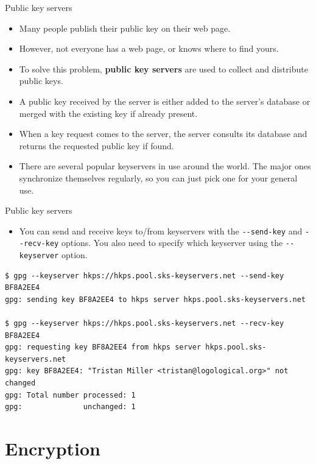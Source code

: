 \documentclass[
mode=present,
paper=smartboard,
size=20pt,
]{powerdot}
\newcommand{\clopt}[1]{\texttt{{-}#1}}
\begin{document}
\begin{slide}{Public key servers}
  \begin{itemize}
  \item Many people publish their public key on their web page.
  \item However, not everyone has a web page, or knows where to find
    yours.
  \item To solve this problem, \textbf{public key servers} are used to
    collect and distribute public keys.
  \item A public key received by the server is either added to the
    server's database or merged with the existing key if already
    present.
  \item When a key request comes to the server, the server consults
    its database and returns the requested public key if found.
  \item There are several popular keyservers in use around the world.
    The major ones synchronize themselves regularly, so you can just
    pick one for your general use.
  \end{itemize}
\end{slide}

\makeatletter\renewcommand{\verbatim@font}{\footnotesize\tt}\makeatother
\begin{slide}[method=direct,toc=]{Public key servers}
  \begin{itemize}
  \item You can send and receive keys to/from keyservers with the
    \clopt{-send-key} and \clopt{-recv-key} options.  You also need to
    specify which keyserver using the \clopt{-keyserver} option.
  \end{itemize}
\begin{verbatim}
$ gpg --keyserver hkps://hkps.pool.sks-keyservers.net --send-key BF8A2EE4
gpg: sending key BF8A2EE4 to hkps server hkps.pool.sks-keyservers.net

$ gpg --keyserver hkps://hkps.pool.sks-keyservers.net --recv-key BF8A2EE4
gpg: requesting key BF8A2EE4 from hkps server hkps.pool.sks-keyservers.net
gpg: key BF8A2EE4: "Tristan Miller <tristan@logological.org>" not changed
gpg: Total number processed: 1
gpg:              unchanged: 1
\end{verbatim}
\end{slide}

\section{Encryption}
\end{document}

